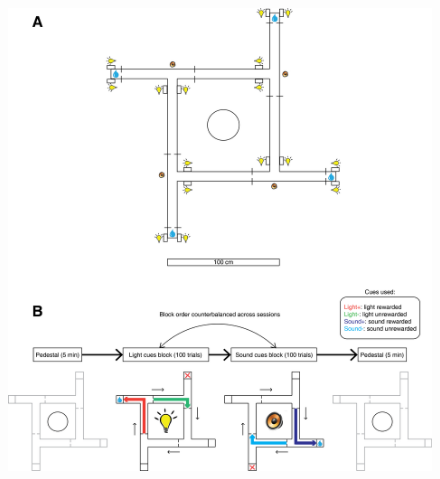 \documentclass[11pt]{article}
\begin{document}
\begin{figure}[h]
\centering
\includegraphics[width=\textwidth]{Fig 2 - Schematic task.png}

\end{figure}
\end{document}

